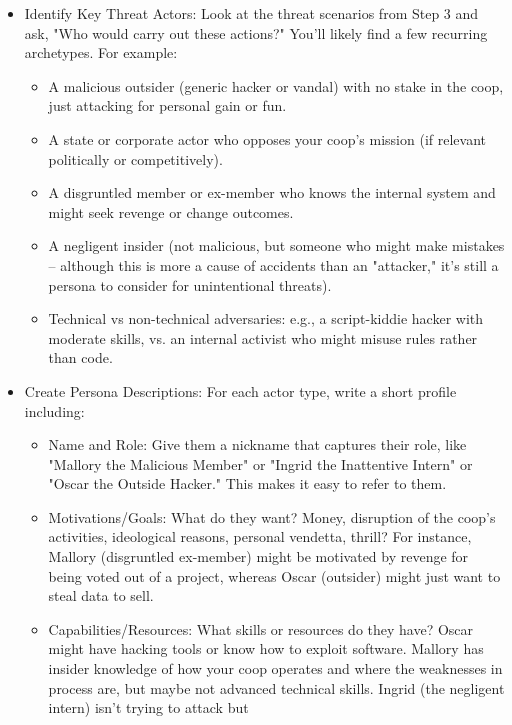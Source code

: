 \begin{itemize}
    \item Identify Key Threat Actors: Look at the threat scenarios from Step 3 and ask, "Who would carry out these
    actions?" You'll likely find a few recurring archetypes. For example:
        \begin{itemize}
            \item A malicious outsider (generic hacker or vandal) with no stake in the coop, just attacking for
            personal gain or fun.
            \item A state or corporate actor who opposes your coop's mission (if relevant politically or
            competitively).
            \item A disgruntled member or ex-member who knows the internal system and might seek revenge or change
            outcomes.
            \item A negligent insider (not malicious, but someone who might make mistakes – although this is more a
            cause of accidents than an "attacker," it's still a persona to consider for unintentional threats).
            \item Technical vs non-technical adversaries: e.g., a script-kiddie hacker with moderate skills, vs. an
            internal activist who might misuse rules rather than code.
        \end{itemize}
    \item Create Persona Descriptions: For each actor type, write a short profile including:
        \begin{itemize}
            \item Name and Role: Give them a nickname that captures their role, like "Mallory the Malicious Member"
            or "Ingrid the Inattentive Intern" or "Oscar the Outside Hacker." This makes it easy to refer to them.
            \item Motivations/Goals: What do they want? Money, disruption of the coop's activities, ideological
            reasons, personal vendetta, thrill? For instance, Mallory (disgruntled ex-member) might be motivated by revenge
            for being voted out of a project, whereas Oscar (outsider) might just want to steal data to sell.
            \item Capabilities/Resources: What skills or resources do they have? Oscar might have hacking tools or know
            how to exploit software. Mallory has insider knowledge of how your coop operates and where the weaknesses in
            process are, but maybe not advanced technical skills. Ingrid (the negligent intern) isn't trying to attack but

\end{itemize}
\end{itemize}
